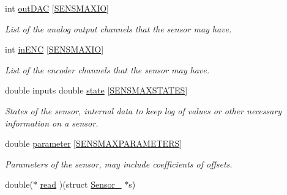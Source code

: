 \begin{DoxyCompactItemize}
\mbox{\label{struct_sensor___a143ba379d8bc7cb5b73fe11f1ee26820}} 
int \hyperlink{struct_sensor___a143ba379d8bc7cb5b73fe11f1ee26820}{out\+D\+AC} \mbox{[}\hyperlink{_sensor_8h_a2345d78555d279eeaef981d064465792}{S\+E\+N\+S\+M\+A\+X\+IO}\mbox{]}
\begin{DoxyCompactList}\small\item\em List of the analog output channels that the sensor may have. \end{DoxyCompactList}\item 
\mbox{\label{struct_sensor___ab87f972a28ac0e2014c595c723d0360f}} 
int \hyperlink{struct_sensor___ab87f972a28ac0e2014c595c723d0360f}{in\+E\+NC} \mbox{[}\hyperlink{_sensor_8h_a2345d78555d279eeaef981d064465792}{S\+E\+N\+S\+M\+A\+X\+IO}\mbox{]}
\begin{DoxyCompactList}\small\item\em List of the encoder channels that the sensor may have. \end{DoxyCompactList}\item 
\mbox{\label{struct_sensor___a8c505bc8e3393890fa5977dd12a69bc7}} 
double inputs double \hyperlink{struct_sensor___a8c505bc8e3393890fa5977dd12a69bc7}{state} \mbox{[}\hyperlink{_sensor_8h_aaef3a6b7d94f6c074a095cf402af34e8}{S\+E\+N\+S\+M\+A\+X\+S\+T\+A\+T\+ES}\mbox{]}
\begin{DoxyCompactList}\small\item\em States of the sensor, internal data to keep log of values or other necessary information on a sensor. \end{DoxyCompactList}\item 
\mbox{\label{struct_sensor___a9daac12cfa19a687feaefc738aaf535a}} 
double \hyperlink{struct_sensor___a9daac12cfa19a687feaefc738aaf535a}{parameter} \mbox{[}\hyperlink{_sensor_8h_ae574c15d7c9187dd43836c1b97371720}{S\+E\+N\+S\+M\+A\+X\+P\+A\+R\+A\+M\+E\+T\+E\+RS}\mbox{]}
\begin{DoxyCompactList}\small\item\em Parameters of the sensor, may include coefficients of offsets. \end{DoxyCompactList}\item 
\mbox{\label{struct_sensor___ad81466de42945848f10d36d377b524d3}} 
double($\ast$ \hyperlink{struct_sensor___ad81466de42945848f10d36d377b524d3}{read} )(struct \hyperlink{struct_sensor__}{Sensor\+\_\+} $\ast$s)

\end{DoxyCompactItemize}
